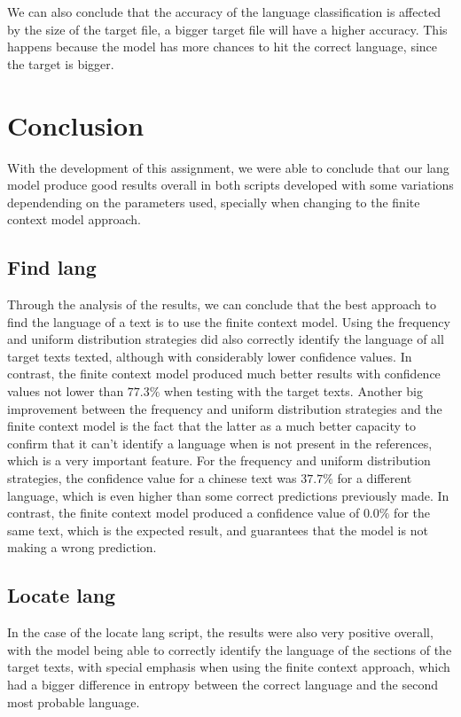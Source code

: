 \documentclass{article}
\begin{document}
We can also conclude that the accuracy of the language classification is affected by the size of the target file, 
a bigger target file will have a higher accuracy.
This happens because the model has more chances to hit the correct language, since the target is bigger.

\section{Conclusion}
\label{sec:conclusion}

With the development of this assignment, we were able to conclude that our lang model
produce good results overall in both scripts developed with some variations dependending on the
parameters used, specially when changing to the finite context model approach.

\subsection{Find lang}
\label{subsec:conclusion:find_lang}

Through the analysis of the results, we can conclude that the best approach to find the language of a text is to use the finite context model.
Using the frequency and uniform distribution strategies did also correctly identify the language of all target texts texted, although with considerably lower confidence values.
In contrast, the finite context model produced much better results with confidence values not lower than $77.3\%$ when testing with the target texts.
Another big improvement between the frequency and uniform distribution strategies and the finite context model is the fact that the latter as a much better capacity to confirm
that it can't identify a language when is not present in the references, which is a very important feature. For the frequency and uniform distribution strategies, the confidence
value for a chinese text was $37.7\%$ for a different language, which is even higher than some correct predictions previously made. In contrast, the finite context model produced a
confidence value of $0.0\%$ for the same text, which is the expected result, and guarantees that the model is not making a wrong prediction.

\subsection{Locate lang}
\label{subsec:conclusion:locate_lang}

In the case of the locate lang script, the results were also very positive overall, with the model being able to correctly identify the language of the sections of the target texts,
with special emphasis when using the finite context approach, which had a bigger difference in entropy between the correct language and the second most probable language.
\end{document}
